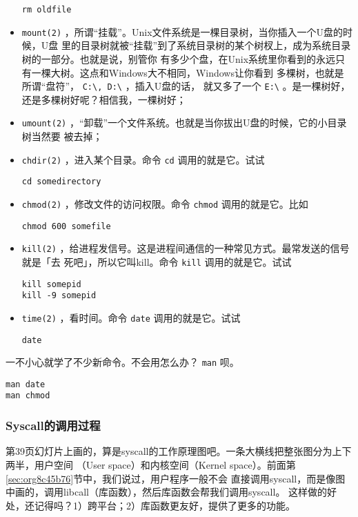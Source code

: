 \documentclass{wx672ctexart}
\newcommand\mpic[1]{%
  \marginpar{\texttt{[image: thumbnails/\#1]}}}
\begin{document}
\begin{itemize}
\begin{verbatim}
rm oldfile
\end{verbatim}
\item \texttt{mount(2)} ，所谓“挂载”。Unix文件系统是一棵目录树，当你插入一个U盘的时候，U盘
  里的目录树就被“挂载”到了系统目录树的某个树杈上，成为系统目录树的一部分。也就是说，别管你
  有多少个盘，在Unix系统里你看到的永远只有一棵大树。这点和Windows大不相同，Windows让你看到
  多棵树，也就是所谓“盘符”， \texttt{C:\textbackslash{}, D:\textbackslash{}} ，插入U盘的话，
  就又多了一个 \texttt{E:\textbackslash{}} 。是一棵树好，还是多棵树好呢？相信我，一棵树好；
\item \texttt{umount(2)} ，“卸载”一个文件系统。也就是当你拔出U盘的时候，它的小目录树当然要
  被去掉；
\item \texttt{chdir(2)} ，进入某个目录。命令 \texttt{cd} 调用的就是它。试试
\begin{verbatim}
cd somedirectory
\end{verbatim}
\item \texttt{chmod(2)} ，修改文件的访问权限。命令 \texttt{chmod} 调用的就是它。比如
\begin{verbatim}
chmod 600 somefile
\end{verbatim}
\item \texttt{kill(2)} ，给进程发信号。这是进程间通信的一种常见方式。最常发送的信号就是「去
  死吧」，所以它叫kill。命令 \texttt{kill} 调用的就是它。试试

\begin{verbatim}
kill somepid
kill -9 somepid
\end{verbatim}

\item \texttt{time(2)} ，看时间。命令 \texttt{date} 调用的就是它。试试
\begin{verbatim}
date
\end{verbatim}
\end{itemize}

一不小心就学了不少新命令。不会用怎么办？ \texttt{man} 呗。
\begin{verbatim}
man date
man chmod
\end{verbatim}

\subsubsection{Syscall的调用过程}
\label{sec:syscall}

\mpic{pg_0039}第39页幻灯片上画的，算是syscall的工作原理图吧。一条大横线把整张图分为上下两半，用户空间
（User space）和内核空间（Kernel space）。前面第\ref{sec:org8c45b76}节中，我们说过，用户程序一般不会
直接调用syscall，而是像图中画的，调用libcall（库函数），然后库函数会帮我们调用syscall。
这样做的好处，还记得吗？1）跨平台；2）库函数更友好，提供了更多的功能。
\end{document}
